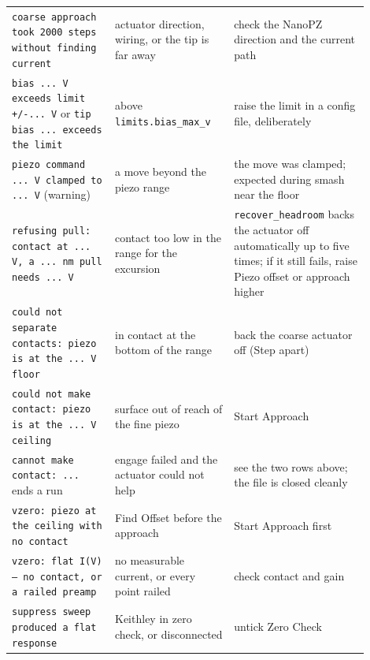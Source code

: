 \begin{longtable}{@{}>{\raggedright\arraybackslash}p{0.26\linewidth}>{\raggedright\arraybackslash}p{0.30\linewidth}>{\raggedright\arraybackslash}p{0.34\linewidth}@{}}
\texttt{coarse approach took 2000 steps without finding current} & actuator direction, wiring, or the tip is far away & check the NanoPZ direction and the current path \\
\texttt{bias .\discretionary{}{}{}.\discretionary{}{}{}.\discretionary{}{}{} V exceeds limit +/\discretionary{}{}{}-.\discretionary{}{}{}.\discretionary{}{}{}.\discretionary{}{}{} V} or \texttt{tip bias .\discretionary{}{}{}.\discretionary{}{}{}.\discretionary{}{}{} exceeds the limit} & above \texttt{limits.\discretionary{}{}{}bias\_\discretionary{}{}{}max\_\discretionary{}{}{}v} & raise the limit in a config file, deliberately \\
\texttt{piezo command .\discretionary{}{}{}.\discretionary{}{}{}.\discretionary{}{}{} V clamped to .\discretionary{}{}{}.\discretionary{}{}{}.\discretionary{}{}{} V} (warning) & a move beyond the piezo range & the move was clamped; expected during smash near the floor \\
\texttt{refusing pull: contact at .\discretionary{}{}{}.\discretionary{}{}{}.\discretionary{}{}{} V,\discretionary{}{}{} a .\discretionary{}{}{}.\discretionary{}{}{}.\discretionary{}{}{} nm pull needs .\discretionary{}{}{}.\discretionary{}{}{}.\discretionary{}{}{} V} & contact too low in the range for the excursion & \texttt{recover\_\discretionary{}{}{}headroom} backs the actuator off automatically up to five times; if it still fails, raise Piezo offset or approach higher \\
\texttt{could not separate contacts: piezo is at the .\discretionary{}{}{}.\discretionary{}{}{}.\discretionary{}{}{} V floor} & in contact at the bottom of the range & back the coarse actuator off (Step apart) \\
\texttt{could not make contact: piezo is at the .\discretionary{}{}{}.\discretionary{}{}{}.\discretionary{}{}{} V ceiling} & surface out of reach of the fine piezo & Start Approach \\
\texttt{cannot make contact: .\discretionary{}{}{}.\discretionary{}{}{}.\discretionary{}{}{}} ends a run & engage failed and the actuator could not help & see the two rows above; the file is closed cleanly \\
\texttt{vzero: piezo at the ceiling with no contact} & Find Offset before the approach & Start Approach first \\
\texttt{vzero: flat I(V) -- no contact,\discretionary{}{}{} or a railed preamp} & no measurable current, or every point railed & check contact and gain \\
\texttt{suppress sweep produced a flat response} & Keithley in zero check, or disconnected & untick Zero Check \\

\end{longtable}
